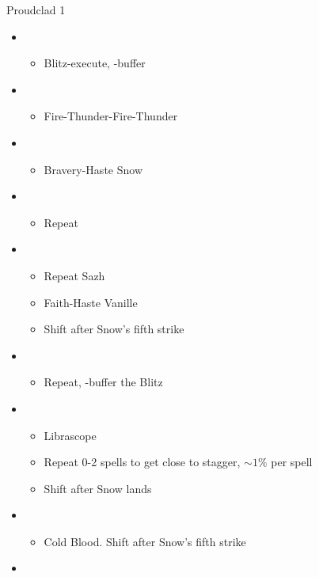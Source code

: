 \begin{battle}[1:31]{Proudclad 1}
	\begin{itemize}
		\item \second
		      \begin{itemize}
			      \item Blitz-execute, \rav-buffer
		      \end{itemize}
		\item \sixth
		      \begin{itemize}
			      \item Fire-Thunder-Fire-Thunder
		      \end{itemize}
		\item \fourth
		      \begin{itemize}
			      \item Bravery-Haste Snow
		      \end{itemize}
		\item \sixth
		      \begin{itemize}
			      \item Repeat
		      \end{itemize}
		\item \fourth
		      \begin{itemize}
			      \item Repeat Sazh
			      \item Faith-Haste Vanille
			      \item Shift after Snow's fifth strike
		      \end{itemize}
		\item \second
		      \begin{itemize}
			      \item Repeat, \rav-buffer the Blitz
		      \end{itemize}
		\item \fifth
		      \begin{itemize}
			      \item Librascope
			      \item Repeat 0-2 spells to get close to stagger, $\sim1\%$ per spell
			      \item Shift after Snow lands
		      \end{itemize}
		\item \sixth
		      \begin{itemize}
			      \item Cold Blood. Shift after Snow's fifth strike
		      \end{itemize}
		\item \fifth

\end{itemize}
\end{battle}
